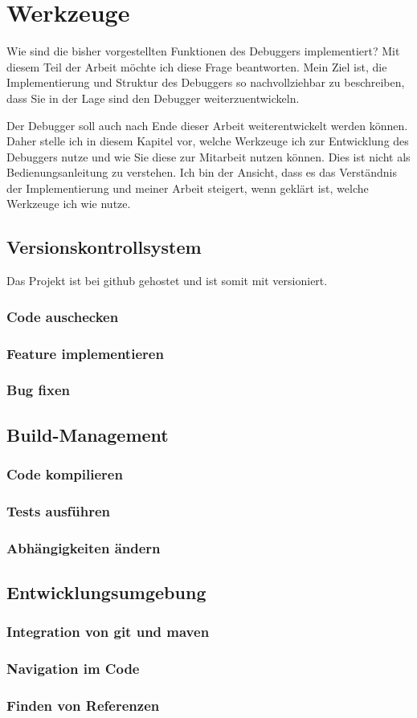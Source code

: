 \chapter{Werkzeuge}
Wie sind die bisher vorgestellten Funktionen des Debuggers implementiert? Mit diesem Teil der Arbeit möchte ich diese Frage beantworten. Mein Ziel ist, die Implementierung und Struktur des Debuggers so nachvollziehbar zu beschreiben, dass Sie in der Lage sind den Debugger weiterzuentwickeln.

Der Debugger soll auch nach Ende dieser Arbeit weiterentwickelt werden können. Daher stelle ich in diesem Kapitel vor, welche Werkzeuge ich zur Entwicklung des Debuggers nutze und wie Sie diese zur Mitarbeit nutzen können. Dies ist nicht als Bedienungsanleitung zu verstehen. Ich bin der Ansicht, dass es das Verständnis der Implementierung und meiner Arbeit steigert, wenn geklärt ist, welche Werkzeuge ich wie nutze.

\section{Versionskontrollsystem}
Das Projekt ist bei github %
gehostet und ist somit mit \git versioniert.

\subsection{Code auschecken}
\subsection{Feature implementieren}
\subsection{Bug fixen}
\section{Build-Management}
\subsection{Code kompilieren}
\subsection{Tests ausführen}
\subsection{Abhängigkeiten ändern}
\section{Entwicklungsumgebung}
\subsection{Integration von git und maven}
\subsection{Navigation im Code}
\subsection{Finden von Referenzen}